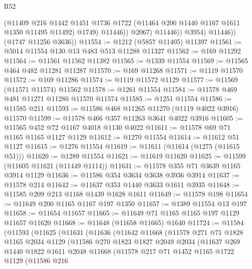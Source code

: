 \begin{lexlean}{R52}
\begin{coremodule}
                      (@11409
                        @216
                        @1442
                        @1451
                        @1736
                        @1722
                        (@11464 @200 @1440 @1167 @1611 @1350 @11495 @11492)
                        @1749)
                      @11446))
                  @2067)
                @11446))
            @3954)
          @11446))
      (@1747 @11256 @3636))
@11554 := @1212 (@5857 @11405) @11397
@11561 := @5014 @11554 @130 @13 @483 @513 @11288 @11327
@11562 := @169 @11292
@11564 := @11561 @11562 @11382
@11565 := @1339 @11554
@11569 := @11565 @464 @482 @11281 @11287
@11570 := @169 @11268
@11571 := @1119 @11570
@11572 := @169 @11286
@11574 := @1119 @11572 @1129
@11577 := @11569 (@11571 @11574) @11562
@11578 := @1261 @11554
@11584 := @11578 @469 @481 @11271 @11280 @11570 @11574
@11585 := @1251 @11554
@11586 := @11585 @211
@11593 := @11586 @468 @11265 @11270 (@1119 @4022 @3916) @11570
@11599 := @11578 @466 @357 @11263 @3641 @4022 @3916
@11605 := @11565 @452 @72 @1167 @4018 @1130 @4022
@11611 := @11578 @69 @71 @1165 @1165 @1127 @1129
@11612 := @1270 @11554
@11614 := @11612 @51 @1127
@11615 := @1276 @11554
@11619 := @11611 (@11614 (@1275 (@11615 @51)))
@11620 := @1289 @11554
@11621 := @11619 @11620
@11625 := @11599 (@11605 @11621 (@11449 @1114))
@11631 := @11578 @355 @71 @3639 @1165 @3914 @1129
@11636 := @11586 @354 @3634 @3638 @3936 @3914
@11637 := @11578 @214
@11642 := @11637 @353 @1440 @3633 @1611 @3935
@11648 := @11585 @209 @213 @1168 @1439 @1628 @1611
@11649 := @11578 @198
@11654 := @11649 @200 @1165 @1167 @197 @1350
@11657 := @1389 @11554 @13 @197
@11658 := @11654 @11657
@11665 := @11649 @71 @1165 @1165 @197 @1129 @11657 @11620
@11668 := @11648 (@11658 @11665) @1640
@11724 := @11584
    (@11593
      (@11625
        (@11631
          (@11636
            (@11642
              @11668
              (@11578
                @271
                @71
                @1828
                @1165
                @2034
                @1129
                (@11586
                  @270
                  @1823
                  @1827
                  @2049
                  @2034
                  (@11637
                    @269
                    @1440
                    @1822
                    @1611
                    @2048
                    @11668
                    (@11578
                      @217
                      @71
                      @1452
                      @1165
                      @1722
                      @1129
                      (@11586
                        @216

\end{coremodule}
\end{lexlean}
